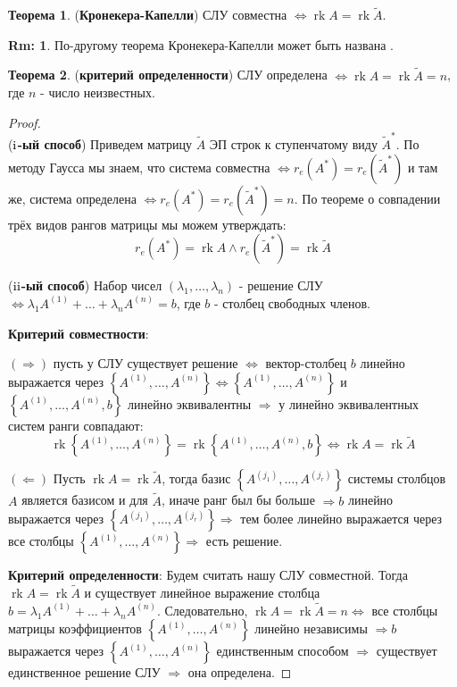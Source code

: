 \documentclass[12pt]{article}
\newcommand{\RN}[1]{%
	\textup{\uppercase\expandafter{\romannumeral#1}}%
}
\theoremstyle{definition}
\newtheorem{rem}{Rm:}
\newtheorem{theorem}{Теорема}
\DeclareMathOperator{\rk}{\text{rk}}
\newcommand{\wte}[1]{\widetilde{#1}}
\begin{document}
\begin{theorem}(\textbf{Кронекера-Капелли})
	СЛУ совместна $\Leftrightarrow \rk{A} = \rk{\wte{A}}$.
\end{theorem}
\begin{rem}
	По-другому теорема Кронекера-Капелли может быть названа .
\end{rem}
\begin{theorem}(\textbf{критерий определенности})
	СЛУ определена $\Leftrightarrow \rk{A} = \rk{\wte{A}} = n$, где $n$ - число неизвестных.
\end{theorem}
\begin{proof}
	\hfill\\
	(\textbf{$\RN{1}$-ый способ}) Приведем матрицу $\wte{A}$ ЭП строк к ступенчатому виду $\wte{A}^*$. По методу Гаусса мы знаем, что система совместна $\Leftrightarrow r_e(A^*) = r_e\left(\wte{A}^*\right)$ и там же, система определена $\Leftrightarrow r_e(A^*) = r_e\left(\wte{A}^*\right) = n$. По теореме о совпадении трёх видов рангов матрицы мы можем утверждать:
	$$
		r_e(A^*) = \rk{A} \wedge r_e\left(\wte{A}^*\right) = \rk{\wte{A}}
	$$
	
	(\textbf{$\RN{2}$-ый способ}) Набор чисел $(\lambda_1, \dotsc, \lambda_n)$ - решение СЛУ $\Leftrightarrow \lambda_1 A^{(1)} + \dotsc + \lambda_n A^{(n)} = b$, где $b$ - столбец свободных членов.
	
	\textbf{Критерий совместности}: 
	
	$(\Rightarrow)$ пусть у СЛУ существует решение $\Leftrightarrow$ вектор-столбец $b$ линейно выражается через $\left\{A^{(1)},\dotsc, A^{(n)}\right\} \Leftrightarrow \left\{A^{(1)},\dotsc, A^{(n)}\right\}$ и $\left\{A^{(1)},\dotsc, A^{(n)},b\right\}$ линейно эквивалентны $\Rightarrow$ у линейно эквивалентных систем ранги совпадают: 
	$$
		\rk{\left\{A^{(1)},\dotsc, A^{(n)}\right\}} = \rk{\left\{A^{(1)},\dotsc, A^{(n)},b\right\}} \Leftrightarrow \rk{A} = \rk{\wte{A}}
	$$
	
	$(\Leftarrow)$ Пусть $\rk{A} = \rk{\wte{A}}$, тогда базис $\left\{A^{(j_1)},\dotsc, A^{(j_r)}\right\}$ системы столбцов $A$ является базисом и для $\wte{A}$, иначе ранг был бы больше $\Rightarrow b$ линейно выражается через $\left\{A^{(j_1)},\dotsc, A^{(j_r)}\right\} \Rightarrow$ тем более линейно выражается через все столбцы $\left\{A^{(1)},\dotsc, A^{(n)}\right\} \Rightarrow$ есть решение.
	
	\textbf{Критерий определенности}: Будем считать нашу СЛУ совместной. Тогда $\rk{A} = \rk{\wte{A}}$ и существует линейное выражение столбца $b  =\lambda_1 A^{(1)} + \dotsc + \lambda_n A^{(n)}$. Следовательно, $\rk{A} = \rk{\wte{A}} = n \Leftrightarrow$ все столбцы матрицы коэффициентов $\left\{A^{(1)},\dotsc, A^{(n)}\right\}$ линейно независимы $\Rightarrow b$ выражается через  $\left\{A^{(1)},\dotsc, A^{(n)}\right\}$ единственным способом $\Rightarrow$ существует единственное решение СЛУ $\Rightarrow$ она определена.
	

\end{proof}
\end{document}
